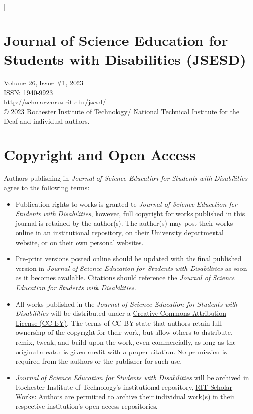 \documentclass[11.5pt]{sig-alternate}
\begin{document}
\twocolumn[
\begin{@twocolumnfalse}
 \section*{Journal of Science Education for Students with Disabilities (JSESD)}
 
Volume 26, Issue \#1, 2023\\ISSN: 1940-9923\\
\href{http://scholarworks.rit.edu/jsesd/}{http://scholarworks.rit.edu/jsesd/}\\
© 2023 Rochester Institute of Technology/ National Technical Institute for the Deaf and
individual authors.\\
 \section*{Copyright and Open Access}
Authors publishing in \textit{Journal of Science Education for Students with Disabilities} agree to the following terms:
\begin{itemize}
    \item 
Publication rights to works is granted to \textit{Journal of Science Education for Students with Disabilities}, however, full copyright for works published in this journal is retained by the author(s). The author(s) may post their works online in an institutional repository, on their University departmental website, or on their own personal websites.
 \item 
Pre-print versions posted online should be updated with the final published version in \textit{Journal of Science Education for Students with Disabilities} as soon as it becomes available. Citations should reference the \textit{Journal of Science Education for Students with Disabilities}.
 \item 
All works published in the \textit{Journal of Science Education for Students with Disabilities} will be distributed under a \href{http://creativecommons.org/licenses/by/3.0/}{Creative Commons Attribution License (CC-BY)}. The terms of CC-BY state that authors retain full ownership of the copyright for their work, but allow others to distribute, remix, tweak, and build upon the work, even commercially, as long as the original creator is given credit with a proper citation. No permission is required from the authors or the publisher for such use.
 \item 
\textit{Journal of Science Education for Students with Disabilities} will be archived in Rochester Institute of Technology's institutional repository, \href{https://scholarworks.rit.edu/}{RIT Scholar Works}: Authors are permitted to archive their individual work(s) in their respective institution's open access repositories.
\end{itemize}


\end{@twocolumnfalse}
\end{document}
